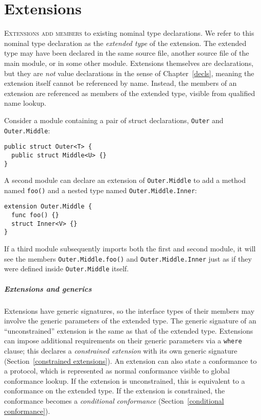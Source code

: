 \documentclass[../generics]{subfiles}
\begin{document}
\chapter{Extensions}\label{extensions}

\lettrine{E}{xtensions add members} to existing nominal type declarations. We refer to this nominal type declaration as the \emph{extended type} of the extension. The extended type may have been declared in the same source file, another source file of the main module, or in some other module. Extensions themselves are declarations, but they are \emph{not} value declarations in the sense of Chapter~\ref{decls}, meaning the extension itself cannot be referenced by name. Instead, the members of an extension are referenced as members of the extended type, visible from qualified name lookup.

Consider a module containing a pair of struct declarations, \texttt{Outer} and \texttt{Outer.Middle}:
\begin{Verbatim}
public struct Outer<T> {
  public struct Middle<U> {}
}
\end{Verbatim}
A second module can declare an extension of \texttt{Outer.Middle} to add a method named \texttt{foo()} and a nested type named \texttt{Outer.Middle.Inner}:
\begin{Verbatim}
extension Outer.Middle {
  func foo() {}
  struct Inner<V> {}
}
\end{Verbatim}
If a third module subsequently imports both the first and second module, it will see the members \texttt{Outer.Middle.foo()} and \texttt{Outer.Middle.Inner} just as if they were defined inside \texttt{Outer.Middle} itself. 

\paragraph{Extensions and generics}
Extensions have generic signatures, so the interface types of their members may involve the generic parameters of the extended type. The generic signature of an ``unconstrained'' extension is the same as that of the extended type. Extensions can impose additional requirements on their generic parameters via a \texttt{where} clause; this declares a \emph{constrained extension} with its own generic signature (Section~\ref{constrained extensions}). An extension can also state a conformance to a protocol, which is represented as normal conformance visible to global conformance lookup. If the extension is unconstrained, this is equivalent to a conformance on the extended type. If the extension is constrained, the conformance becomes a \emph{conditional conformance} (Section~\ref{conditional conformance}).
\end{document}
